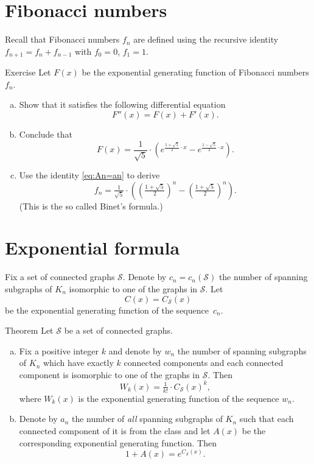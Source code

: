 \section*{Fibonacci numbers}

Recall that Fibonacci numbers $f_n$ are defined using the recursive identity 
$f_{n+1}=f_n+f_{n-1}$
with $f_0=0$, $f_1=1$.

\begin{thm}{Exercise}
Let $F(x)$ be the exponential generating function of Fibonacci numbers $f_n$.
\begin{enumerate}[(a)]
\item Show that it satisfies the following differential equation
\[F''(x)=F(x)+F'(x).\]
\item Conclude that 
\[F(x)=\frac{1}{\sqrt5}\cdot\left(e^{\frac{1+\sqrt{5}}{2}\cdot x}- e^{\frac{1-\sqrt{5}}{2}\cdot x}\right).\]
\item Use the identity \ref{eq:An=an} to derive 
\[f_n=\tfrac{1}{\sqrt5}\cdot\left((\tfrac{1+\sqrt{5}}{2})^n-(\tfrac{1+\sqrt{5}}{2})^n\right).\]
(This is the so called Binet's formula.) 
\end{enumerate}

\end{thm}


\section*{Exponential formula}

Fix a set of connected graphs $\mathcal{S}$.
Denote by $c_n=c_n(\mathcal{S})$ the number of spanning subgraphs of $K_n$ isomorphic to one of the graphs in $\mathcal{S}$. 
Let \[C(x)=C_{\mathcal{S}}(x)\] be the exponential generating function of the sequence~$c_n$. 


\begin{thm}{Theorem}\label{thm:exp-formula}
Let $\mathcal{S}$ be a set of connected graphs. 

\begin{enumerate}[(a)]
\item\label{thm:exp-formula:Wk} Fix a positive integer $k$ and denote by $w_n$ the number of spanning subgraphs of $K_n$ which have exactly $k$ connected components and each connected component is  isomorphic to one of the graphs in $\mathcal{S}$.
Then
\[W_k(x)=\tfrac1{k!}\cdot C_{\mathcal{S}}(x)^k,\]
where $W_k(x)$ is the exponential generating function of the sequence $w_n$.

\item\label{thm:exp-formula:all} Denote by $a_n$ the number of \emph{all} spanning subgraphs of $K_n$ such that each connected component of it is from the class and let $A(x)$ be the corresponding exponential generating function.
Then
\[1+A(x)=e^{C_{\mathcal{S}}(x)}.\]
\end{enumerate}

\end{thm}

